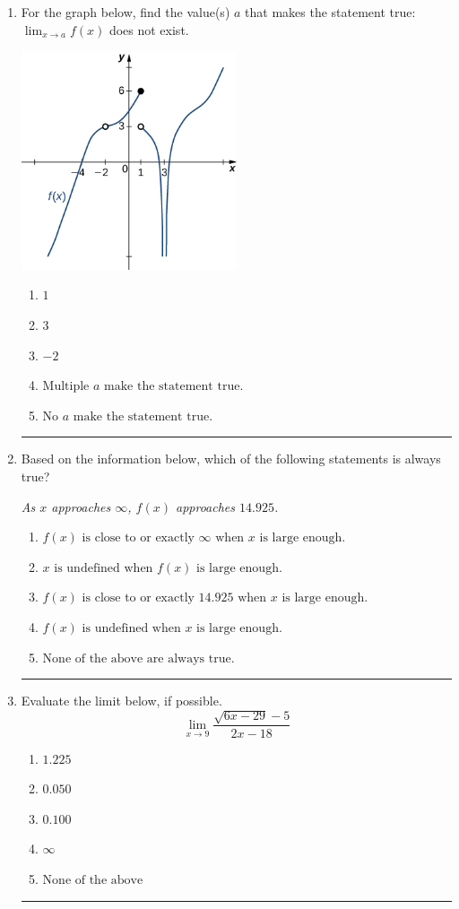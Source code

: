 \documentclass[14pt]{extbook}
\newcommand{\litem}[1]{\item#1\hspace*{-1cm}\rule{\textwidth}{0.4pt}}
\begin{document}
\begin{enumerate}
{\begin{enumerate}[label=\Alph*.]
\end{enumerate} }
\litem{
For the graph below, find the value(s) $a$ that makes the statement true: $ \displaystyle \lim_{x \rightarrow a} f(x)$ does not exist.
\begin{center}
    \includegraphics[width=0.5\textwidth]{../Figures/evaluateLimitGraphicallyCopyC.png}
\end{center}
\begin{enumerate}[label=\Alph*.]
\item \( 1 \)
\item \( 3 \)
\item \( -2 \)
\item \( \text{Multiple } a \text{ make the statement true}. \)
\item \( \text{No } a \text{ make the statement true}. \)

\end{enumerate} }
\litem{
Based on the information below, which of the following statements is always true?
\begin{center}
    \textit{ As $x$ approaches $\infty$, $f(x)$ approaches $14.925$. }
\end{center}
\begin{enumerate}[label=\Alph*.]
\item \( f(x) \text{ is close to or exactly } \infty \text{ when } x \text{ is large enough}. \)
\item \( x \text{ is undefined when } f(x) \text{ is large enough}. \)
\item \( f(x) \text{ is close to or exactly } 14.925 \text{ when } x \text{ is large enough}. \)
\item \( f(x) \text{ is undefined when } x \text{ is large enough}. \)
\item \( \text{None of the above are always true.} \)

\end{enumerate} }
\litem{
Evaluate the limit below, if possible.\[ \lim_{x \rightarrow 9} \frac{\sqrt{6x - 29} - 5}{2x - 18} \]\begin{enumerate}[label=\Alph*.]
\item \( 1.225 \)
\item \( 0.050 \)
\item \( 0.100 \)
\item \( \infty \)
\item \( \text{None of the above} \)


\end{enumerate}}
\end{enumerate}
\end{document}
